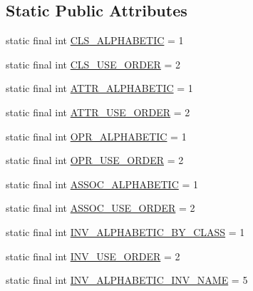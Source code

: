 \subsection*{Static Public Attributes}
\begin{DoxyCompactItemize}
\item 
static final int \hyperlink{classorg_1_1tzi_1_1use_1_1gui_1_1main_1_1_model_browser_sorting_a1fb828ea093401f4927822237dd320d0}{C\-L\-S\-\_\-\-A\-L\-P\-H\-A\-B\-E\-T\-I\-C} = 1
\item 
static final int \hyperlink{classorg_1_1tzi_1_1use_1_1gui_1_1main_1_1_model_browser_sorting_a5c54bb4fa4189e2773f7f457d6cf1138}{C\-L\-S\-\_\-\-U\-S\-E\-\_\-\-O\-R\-D\-E\-R} = 2
\item 
static final int \hyperlink{classorg_1_1tzi_1_1use_1_1gui_1_1main_1_1_model_browser_sorting_ac6079183697860abde1efa6831377d43}{A\-T\-T\-R\-\_\-\-A\-L\-P\-H\-A\-B\-E\-T\-I\-C} = 1
\item 
static final int \hyperlink{classorg_1_1tzi_1_1use_1_1gui_1_1main_1_1_model_browser_sorting_a5bb0f900f4a6680946bbcb500fa781e0}{A\-T\-T\-R\-\_\-\-U\-S\-E\-\_\-\-O\-R\-D\-E\-R} = 2
\item 
static final int \hyperlink{classorg_1_1tzi_1_1use_1_1gui_1_1main_1_1_model_browser_sorting_ac8d1d2a1d2e05a00f44b44b50c7b183d}{O\-P\-R\-\_\-\-A\-L\-P\-H\-A\-B\-E\-T\-I\-C} = 1
\item 
static final int \hyperlink{classorg_1_1tzi_1_1use_1_1gui_1_1main_1_1_model_browser_sorting_afef24285ba4c614f9eced7fc91e01cb0}{O\-P\-R\-\_\-\-U\-S\-E\-\_\-\-O\-R\-D\-E\-R} = 2
\item 
static final int \hyperlink{classorg_1_1tzi_1_1use_1_1gui_1_1main_1_1_model_browser_sorting_ac937508fefc10d9fa8e38989798f6716}{A\-S\-S\-O\-C\-\_\-\-A\-L\-P\-H\-A\-B\-E\-T\-I\-C} = 1
\item 
static final int \hyperlink{classorg_1_1tzi_1_1use_1_1gui_1_1main_1_1_model_browser_sorting_aa473fe8f3e73f0808e376545ef463581}{A\-S\-S\-O\-C\-\_\-\-U\-S\-E\-\_\-\-O\-R\-D\-E\-R} = 2
\item 
static final int \hyperlink{classorg_1_1tzi_1_1use_1_1gui_1_1main_1_1_model_browser_sorting_a129599ff831fb169ac029d17a683ead0}{I\-N\-V\-\_\-\-A\-L\-P\-H\-A\-B\-E\-T\-I\-C\-\_\-\-B\-Y\-\_\-\-C\-L\-A\-S\-S} = 1
\item 
static final int \hyperlink{classorg_1_1tzi_1_1use_1_1gui_1_1main_1_1_model_browser_sorting_a99765a25f0528e7183ecf1e4dd6b4464}{I\-N\-V\-\_\-\-U\-S\-E\-\_\-\-O\-R\-D\-E\-R} = 2
\item 
static final int \hyperlink{classorg_1_1tzi_1_1use_1_1gui_1_1main_1_1_model_browser_sorting_a2daa658c250e0d7ea9efd67914c7268f}{I\-N\-V\-\_\-\-A\-L\-P\-H\-A\-B\-E\-T\-I\-C\-\_\-\-I\-N\-V\-\_\-\-N\-A\-M\-E} = 5

\end{DoxyCompactItemize}
